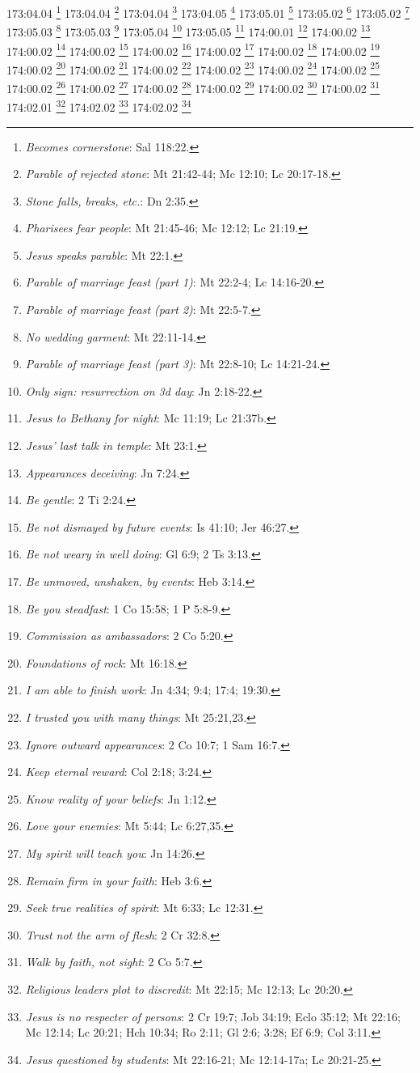 173:04.04 \footnote{\textit{Becomes cornerstone}: Sal 118:22.}
173:04.04 \footnote{\textit{Parable of rejected stone}: Mt 21:42-44; Mc 12:10; Lc 20:17-18.}
173:04.04 \footnote{\textit{Stone falls, breaks, etc.}: Dn 2:35.}
173:04.05 \footnote{\textit{Pharisees fear people}: Mt 21:45-46; Mc 12:12; Lc 21:19.}
173:05.01 \footnote{\textit{Jesus speaks parable}: Mt 22:1.}
173:05.02 \footnote{\textit{Parable of marriage feast (part 1)}: Mt 22:2-4; Lc 14:16-20.}
173:05.02 \footnote{\textit{Parable of marriage feast (part 2)}: Mt 22:5-7.}
173:05.03 \footnote{\textit{No wedding garment}: Mt 22:11-14.}
173:05.03 \footnote{\textit{Parable of marriage feast (part 3)}: Mt 22:8-10; Lc 14:21-24.}
173:05.04 \footnote{\textit{Only sign: resurrection on 3d day}: Jn 2:18-22.}
173:05.05 \footnote{\textit{Jesus to Bethany for night}: Mc 11:19; Lc 21:37b.}
174:00.01 \footnote{\textit{Jesus' last talk in temple}: Mt 23:1.}
174:00.02 \footnote{\textit{Appearances deceiving}: Jn 7:24.}
174:00.02 \footnote{\textit{Be gentle}: 2 Ti 2:24.}
174:00.02 \footnote{\textit{Be not dismayed by future events}: Is 41:10; Jer 46:27.}
174:00.02 \footnote{\textit{Be not weary in well doing}: Gl 6:9; 2 Ts 3:13.}
174:00.02 \footnote{\textit{Be unmoved, unshaken, by events}: Heb 3:14.}
174:00.02 \footnote{\textit{Be you steadfast}: 1 Co 15:58; 1 P 5:8-9.}
174:00.02 \footnote{\textit{Commission as ambassadors}: 2 Co 5:20.}
174:00.02 \footnote{\textit{Foundations of rock}: Mt 16:18.}
174:00.02 \footnote{\textit{I am able to finish work}: Jn 4:34; 9:4; 17:4; 19:30.}
174:00.02 \footnote{\textit{I trusted you with many things}: Mt 25:21,23.}
174:00.02 \footnote{\textit{Ignore outward appearances}: 2 Co 10:7; 1 Sam 16:7.}
174:00.02 \footnote{\textit{Keep eternal reward}: Col 2:18; 3:24.}
174:00.02 \footnote{\textit{Know reality of your beliefs}: Jn 1:12.}
174:00.02 \footnote{\textit{Love your enemies}: Mt 5:44; Lc 6:27,35.}
174:00.02 \footnote{\textit{My spirit will teach you}: Jn 14:26.}
174:00.02 \footnote{\textit{Remain firm in your faith}: Heb 3:6.}
174:00.02 \footnote{\textit{Seek true realities of spirit}: Mt 6:33; Lc 12:31.}
174:00.02 \footnote{\textit{Trust not the arm of flesh}: 2 Cr 32:8.}
174:00.02 \footnote{\textit{Walk by faith, not sight}: 2 Co 5:7.}
174:02.01 \footnote{\textit{Religious leaders plot to discredit}: Mt 22:15; Mc 12:13; Lc 20:20.}
174:02.02 \footnote{\textit{Jesus is no respecter of persons}: 2 Cr 19:7; Job 34:19; Eclo 35:12; Mt 22:16; Mc 12:14; Lc 20:21; Hch 10:34; Ro 2:11; Gl 2:6; 3:28; Ef 6:9; Col 3:11.}
174:02.02 \footnote{\textit{Jesus questioned by students}: Mt 22:16-21; Mc 12:14-17a; Lc 20:21-25.}
